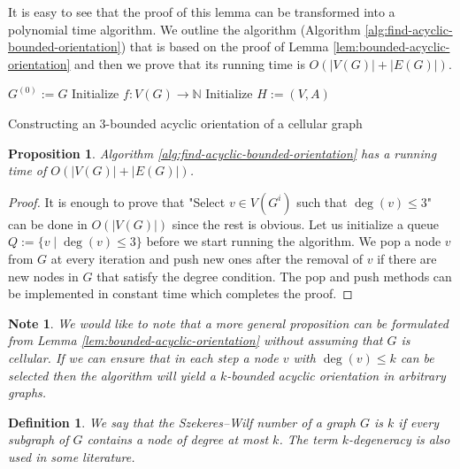 \documentclass[a4paper, 12pt]{article}
\newtheorem{state}[lem]{Proposition}
\newtheorem{defin}[lem]{Definition}
\newtheorem{note}[lem]{Note}
\begin{document}
It is easy to see that the proof of this lemma can be transformed into a polynomial time algorithm. We outline the algorithm (Algorithm \ref{alg:find-acyclic-bounded-orientation}) that is based on the proof of Lemma \ref{lem:bounded-acyclic-orientation} and then we prove that its running time is $O(|V(G)| + |E(G)|)$.
\begin{algorithm}[h!]\label{alg:find-acyclic-bounded-orientation}
 $G^{(0)} := G$\;
 Initialize $f \colon V(G) \to \mathbb{N}$\;
 Initialize $H:=(V,A)$\;
 \caption{Constructing an $3$-bounded acyclic orientation of a cellular graph}
\end{algorithm}
\begin{state}\label{state:acyclic-complexity-proof} Algorithm \ref{alg:find-acyclic-bounded-orientation} has a running time of $O(|V(G)| + |E(G)|)$.
\end{state}
\begin{proof}
It is enough to prove that "Select $v \in V(G^i)$ such that $\deg(v) \leqslant 3$" can be done in $O(|V(G)|)$ since the rest is obvious. Let us initialize a queue $Q := \lbrace v \mid \deg(v) \leqslant  3\rbrace$ before we start running the algorithm. We pop a node $v$ from $G$ at every iteration and push new ones after the removal of $v$ if there are new nodes in $G$ that satisfy the degree condition. The pop and push methods can be implemented in constant time which completes the proof.
\end{proof}

\begin{note} We would like to note that a more general proposition can be formulated from Lemma \ref{lem:bounded-acyclic-orientation} without assuming that $G$ is cellular. If we can ensure that in each step a node $v$ with $\deg(v) \leqslant k$ can be selected then the algorithm will yield a $k$-bounded acyclic orientation in arbitrary graphs.
\end{note}

\begin{defin} We say that the Szekeres\---Wilf number of a graph $G$ is $k$ if every subgraph of $G$ contains a node of degree at most $k$. The term $k$-degeneracy is also used in some literature.
\end{defin}
\end{document}
